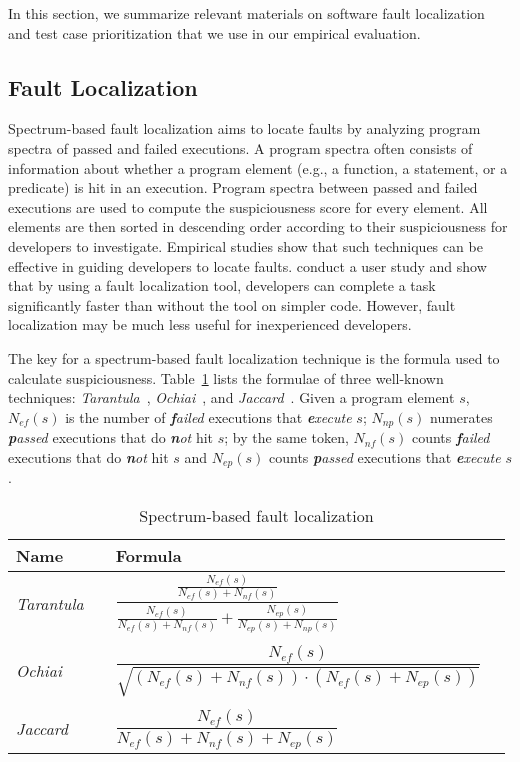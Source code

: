  In this section, we summarize relevant materials on software fault localization and test case prioritization that we use in our empirical evaluation.

\subsection{Fault Localization}\label{sec.prelim.fault_local_test_gen}

Spectrum-based fault localization aims to locate faults by analyzing program spectra of passed and failed executions. A program spectra often consists of information about whether a program element (e.g., a function, a statement, or a predicate) is hit in an execution.
Program spectra between passed and failed executions are used to compute the suspiciousness score for every element. All elements are then sorted in descending order according to their suspiciousness for developers to investigate. Empirical studies \citep[e.g.][]{NainarCRL07,JH05} show that such techniques can be effective in guiding developers to locate faults. \cite{DBLP:conf/issta/ParninO11} conduct a user study and show that by using a fault localization tool, developers can complete a task significantly faster than without the tool on simpler code. However, fault localization may be much less useful for inexperienced developers.

The key for a spectrum-based fault localization technique is the formula used to calculate suspiciousness.
Table~\ref{table_all_techniques} lists the formulae of three well-known techniques: {\em Tarantula}~\citep{JH05}, {\em Ochiai}~\citep{Abreu:2009.jss},
and {\em Jaccard}~\citep{Abreu:2009.jss}. Given a program element $s$,
$N_{ef}(s)$ is the number of {\em \textbf{f}ailed} executions that {\em \textbf{e}xecute} $s$;
$N_{np}(s)$ numerates {\em \textbf{p}assed} executions that do {\em \textbf{n}ot} hit $s$;
by the same token, $N_{nf}(s)$ counts {\em \textbf{f}ailed} executions that do {\em \textbf{n}ot} hit $s$
and $N_{ep}(s)$ counts {\em \textbf{p}assed} executions that {\em \textbf{e}xecute} $s$.


\begin{table}[!h]
	\caption{Spectrum-based fault localization}
        \centering
{
        \renewcommand{\arraystretch}{1.5}
        \begin{tabular}{l l l c} \hline
        Name &\quad& Formula \\ \hline\hline%
        {\em Tarantula} &\quad&  $\dfrac{\frac{N_{ef}(s)}{N_{ef}(s) + N_{nf}(s)}}{\frac{N_{ef}(s)}{N_{ef}(s) + N_{nf}(s)} + \frac{N_{ep}(s)}{N_{ep}(s) + N_{np}(s)}}$ \\ [1ex] \\ [-1.5ex]
        {\em Ochiai} &\quad&  $\dfrac{N_{ef}(s)}{\sqrt{(N_{ef}(s)+N_{nf}(s))\cdot(N_{ef}(s)+N_{ep}(s))}}$ \\ [1ex] \\ [-1.5ex]
		{\em Jaccard} &\quad&  $\dfrac{N_{ef}(s)}{N_{ef}(s)+N_{nf}(s)+N_{ep}(s)}$ \\ \hline
        \end{tabular}
}
    \label{table_all_techniques}
\end{table}

